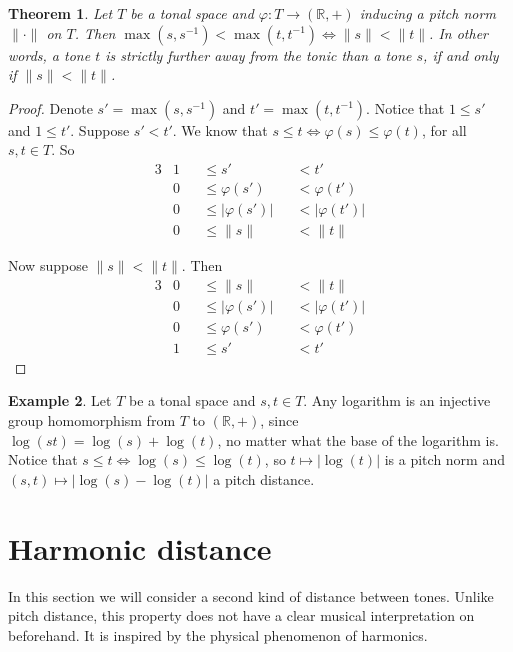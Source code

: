 \documentclass[a4paper]{book}
\newtheorem{theorem}{Theorem}[chapter]
\theoremstyle{definition}
\newtheorem{example}[theorem]{Example}
\begin{document}
\begin{theorem}
    \label{order_preserving_homomorphism}
    Let $T$ be a tonal space and $\varphi : T \to (\mathbb{R},+)$ inducing a pitch norm $\| \cdot \|$ on $T$.
    Then $ \max(s,s^{-1}) < \max(t,t^{-1}) \Leftrightarrow \|s\|<\|t\|$.
    In other words, a tone $t$ is strictly further away from the tonic than a tone $s$, if and only if $\|s\| < \|t\|$.
\end{theorem}
\begin{proof}
    Denote $s' = \max(s,s^{-1})$ and $t' = \max(t,t^{-1})$.
    Notice that $1 \leq s'$ and $1 \leq t'$.
    Suppose $s' < t'$.
    We know that $s \leq t \Leftrightarrow \varphi(s) \leq \varphi(t)$, for all $s,t \in T$.
    So 
    \begin{alignat*}{3}
        & 1 & &\leq s'             & &<  t' \\
        & 0 & &\leq \varphi(s')    & &<  \varphi(t') \\
        & 0 & &\leq |\varphi(s')|  & &<  |\varphi(t')| \\
        & 0 & &\leq \|s\|          & &<  \|t\|
    \end{alignat*}
    
    Now suppose $\|s\|<\|t\|$.
    Then 
    \begin{alignat*}{3}
        & 0 & &\leq \|s\|          & &<  \|t\| \\
        & 0 & &\leq |\varphi(s')|  & &<  |\varphi(t')| \\
        & 0 & &\leq \varphi(s')    & &<  \varphi(t') \\
        & 1 & &\leq s'             & &<  t' 
    \end{alignat*}
\end{proof}

\begin{example}
    \label{log_as_melodic_distance}
    Let $T$ be a tonal space and $s,t \in T$.
    Any logarithm is an injective group homomorphism from $T$ to $(\mathbb{R},+)$, since $\log(st) = \log(s) + \log(t)$, no matter what the base of the logarithm is.
    Notice that $s \leq t \Leftrightarrow \log(s) \leq \log(t)$, so $t \mapsto |\log(t)|$ is a pitch norm and $(s,t) \mapsto |\log(s)-\log(t)|$ a pitch distance.
\end{example}

\section{Harmonic distance}
In this section we will consider a second kind of distance between tones.
Unlike pitch distance, this property does not have a clear musical interpretation on beforehand.
It is inspired by the physical phenomenon of harmonics.
\end{document}
